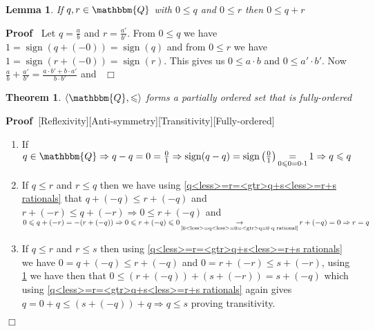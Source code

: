 \documentclass{book}
\newcommand{\Rightarrowlim}{\mathop{\rightarrow}\limits}
\newcommand{\equallim}{\mathop{=}\limits}
\newcommand{\tmop}[1]{\ensuremath{\operatorname{#1}}}
\newcommand{\um}{-}
\newcommand{\upl}{+}
\newenvironment{proof}{\noindent\textbf{Proof\ }}{\hspace*{\fill}$\Box$\medskip}
\newtheorem{lemma}{Lemma}
\newtheorem{theorem}{Theorem}
\begin{document}
{{\begin{lemma}
  \label{0<less>=q and 0<less>=r=<gtr>0<less>=q+r}If $q, r \in \mathbbm{Q}$
  with $0 \leqslant q$ and $0 \leqslant r$ then $0 \leqslant q + r$
\end{lemma}

\begin{proof}
  Let $q = \frac{a}{b}$ and $r = \frac{a'}{b'}$. From $0 \leqslant q$ we have
  $1 = \tmop{sign} (q \upl (- 0)) = \tmop{sign} (q)$ and from $0 \leqslant r$
  we have $1 = \tmop{sign} (r \upl (- 0)) = \tmop{sign} (r)$. This gives us $0
  \leqslant a \cdot b$ and $0 \leqslant a' \cdot b'$. Now $\frac{a}{b} +
  \frac{a'}{b'} = \frac{a \cdot b' + b \cdot a'}{b \cdot b'}$ and \ 
\end{proof}

\begin{theorem}
  \label{rational numbers are fully ordered}$\langle \mathbbm{Q}, \leqslant
  \rangle$ forms a partially ordered set that is fully-ordered
\end{theorem}

\begin{proof}[Reflexivity][Anti-symmetry][Transitivity][Fully-ordered]
  
  \begin{enumerate}
    \item If $q \in \mathbbm{Q} \Rightarrow q \um q = 0 = \frac{0}{1}
    \Rightarrow \tmop{sign} (q \um q) = \tmop{sign} \left( \frac{0}{1} \right)
    \equallim_{0 \leqslant 0 = 0 \cdot 1} 1 \Rightarrow q \leqslant q$
    
    \item If $q \leqslant r$ and $r \leqslant q$ then we have using
    \ref{q<less>=r=<gtr>q+s<less>=r+s rationals} that $q \upl (- q) \leqslant
    r \upl (- q)$ and $r \upl (- r) \leqslant q \upl (- r) \Rightarrow 0
    \leqslant r \upl (- q)$ and $0 \leqslant q + (- r) = - (r \upl (- q))
    \Rightarrow 0 \leqslant r + (- q) \leqslant 0
    \Rightarrowlim_{\text{\ref{0<less>=q<less>=0=<gtr>q=0 q rational}}} r \upl
    (- q) = 0 \Rightarrow r = q$
    
    \item If $q \leqslant r$ and $r \leqslant s$ then using
    \ref{q<less>=r=<gtr>q+s<less>=r+s rationals} we have $0 = q \upl (\um q)
    \leqslant r \upl (- q)$ and $0 = r \upl (- r) \leqslant s \upl (- r)$,
    using \ref{0<less>=q and 0<less>=r=<gtr>0<less>=q+r} we have then that $0
    \leqslant (r \upl (- q)) + (s + (- r)) = s \upl (- q)$ which using
    \ref{q<less>=r=<gtr>q+s<less>=r+s rationals} again gives $q = 0 \upl q
    \leqslant (s \upl (- q)) \upl q \Rightarrow q \leqslant s$ proving
    transitivity.
    

\end{enumerate}
\end{proof}}}
\end{document}
